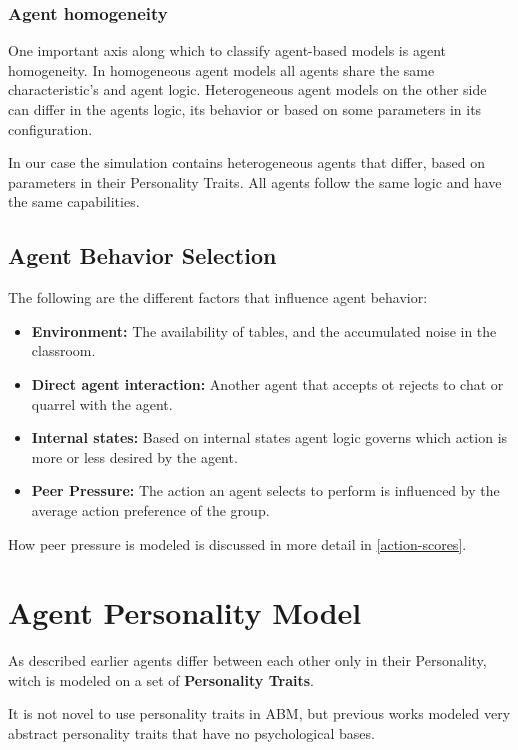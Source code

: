 \subsubsection{Agent homogeneity}
One important axis along which to classify agent-based models is agent homogeneity\cite{Pudane2017}.
In homogeneous agent models all agents share the same characteristic's and agent logic.
Heterogeneous agent models on the other side can differ in the agents logic, its behavior
or based on some parameters in its configuration.

In our case the simulation contains heterogeneous agents that differ, based on parameters
in their Personality Traits. All agents follow the same logic and have the same
capabilities.

\subsection{Agent Behavior Selection}
The following are the different factors that influence agent behavior:

\begin{itemize}
    \item \textbf{Environment:} The availability of tables, and the accumulated noise in the classroom. 
    \item \textbf{Direct agent interaction:} Another agent that accepts ot rejects to chat or quarrel with the agent.
    \item \textbf{Internal states:} Based on internal states agent logic governs which action is more or less desired by the agent.
    \item \textbf{Peer Pressure:} The action an agent selects to perform is influenced by the average action preference of the group.
\end{itemize}

How peer pressure is modeled is discussed in more detail in \ref{action-scores}.


\pagebreak

\label{BigFive}
\section{Agent Personality Model}
As described earlier agents differ between each other only in their Personality, 
witch is modeled on a set of \textbf{Personality Traits}.

It is not novel to use personality traits in ABM, but previous works\cite{Gautam2009}
modeled very abstract personality traits that have no psychological bases.

